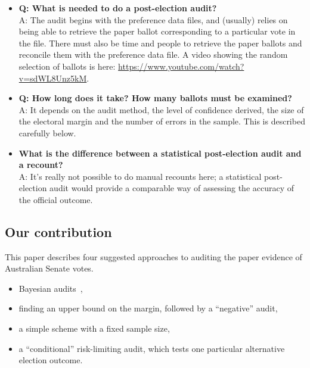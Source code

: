 \documentclass[10pt,a4paper]{article}
\begin{document}
\begin{itemize}
\item {\bf Q: What is needed to do a post-election audit?} \\
    A: The audit begins with the preference data files, and (usually) relies on being able to retrieve the paper ballot corresponding to a particular vote in the file.  There must also be  time and people to retrieve the paper ballots and reconcile them with the preference data file.  A video showing the random selection of ballots is here: \url{https://www.youtube.com/watch?v=sdWL8Unz5kM}.
\item {\bf Q: How long does it take?  How many ballots must be examined?} \\ A: It depends on the audit method, the level of confidence derived, the size of the electoral margin and the number of errors in the sample.  This is described carefully below.    
\item {\bf What is the difference between a statistical post-election audit and a recount?} \\ A: It's really not possible to do manual recounts here; a statistical post-election audit would provide a comparable way of assessing the accuracy of the official outcome.
\end{itemize}


\subsection{Our contribution}
This paper describes four suggested approaches to auditing the paper evidence of Australian Senate votes.  
\begin{itemize}
	\item Bayesian audits~\cite{rivest2012bayesian},
	\item finding an upper bound on the margin, followed by a ``negative'' audit,
	\item a simple scheme with a fixed sample size,  
	\item a ``conditional'' risk-limiting audit, which tests one particular alternative election outcome.

\end{itemize}
\end{document}
